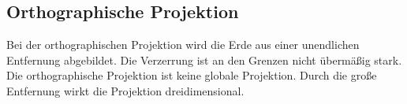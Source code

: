 \subsection{Orthographische Projektion}
\label{sec:ortographproj}
Bei der orthographischen Projektion wird die Erde aus einer unendlichen Entfernung abgebildet.
Die Verzerrung ist an den Grenzen nicht übermäßig stark. Die orthographische Projektion ist keine
globale Projektion. Durch die große Entfernung wirkt die Projektion dreidimensional.
